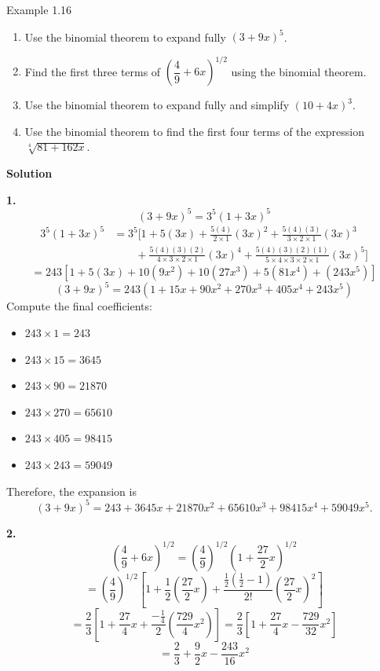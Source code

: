 \begin{example}{Example 1.16}
\begin{enumerate}
  \item Use the binomial theorem to expand fully $(3+9x)^5$.
  \item Find the first three terms of $\left(\dfrac{4}{9}+6x\right)^{1/2}$ using the binomial theorem.
  \item Use the binomial theorem to expand fully and simplify $(10+4x)^3$.
  \item Use the binomial theorem to find the first four terms of the expression $\sqrt[4]{81+162x}$.
\end{enumerate}

\medskip\noindent\textbf{Solution}

\textbf{1.}
\[
  (3+9x)^5 = 3^5(1+3x)^5
\]
\begin{align*}
  3^5(1+3x)^5 &= 3^5\Bigg[1 + 5(3x) + \frac{5(4)}{2\times1}(3x)^2 + \frac{5(4)(3)}{3\times2\times1}(3x)^3 \\
  &\qquad + \frac{5(4)(3)(2)}{4\times3\times2\times1}(3x)^4 + \frac{5(4)(3)(2)(1)}{5\times4\times3\times2\times1}(3x)^5\Bigg]
\end{align*}
\[
  = 243\left[1 + 5(3x) + 10(9x^2) + 10(27x^3) + 5(81x^4) + (243x^5)\right]
\]
\[
  (3+9x)^5 = 243\left(1 + 15x + 90x^2 + 270x^3 + 405x^4 + 243x^5\right)
\]
Compute the final coefficients:
\begin{itemize}
  \item $243 \times 1 = 243$
  \item $243 \times 15 = 3645$
  \item $243 \times 90 = 21870$
  \item $243 \times 270 = 65610$
  \item $243 \times 405 = 98415$
  \item $243 \times 243 = 59049$
\end{itemize}
Therefore, the expansion is
\[
  (3+9x)^5 = 243 + 3645x + 21870x^2 + 65610x^3 + 98415x^4 + 59049x^5.
\]

\textbf{2.}
\[
  \left(\frac{4}{9}+6x\right)^{1/2} = \left(\frac{4}{9}\right)^{1/2}\left(1+\frac{27}{2}x\right)^{1/2}
\]
\[
  = \left(\frac{4}{9}\right)^{1/2}\left[1 + \frac{1}{2}\left(\frac{27}{2}x\right) + \frac{\tfrac{1}{2}\left(\tfrac{1}{2}-1\right)}{2!}\left(\frac{27}{2}x\right)^2\right]
\]
\[
  = \frac{2}{3}\left[1 + \frac{27}{4}x + \frac{-\tfrac{1}{4}}{2}\left(\frac{729}{4}x^2\right)\right]
  = \frac{2}{3}\left[1 + \frac{27}{4}x - \frac{729}{32}x^2\right]
\]
\[
  = \frac{2}{3} + \frac{9}{2}x - \frac{243}{16}x^2
\]


\end{example}
